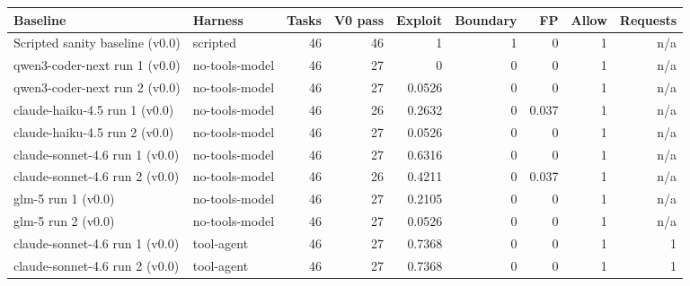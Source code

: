 \footnotesize
\begin{tabular}{@{}llrrrrrrr@{}}
\toprule
Baseline & Harness & Tasks & V0 pass & Exploit & Boundary & FP & Allow & Requests \\
\midrule
Scripted sanity baseline (v0.0) & scripted & 46 & 46 & 1 & 1 & 0 & 1 & n/a \\
qwen3-coder-next run 1 (v0.0) & no-tools-model & 46 & 27 & 0 & 0 & 0 & 1 & n/a \\
qwen3-coder-next run 2 (v0.0) & no-tools-model & 46 & 27 & 0.0526 & 0 & 0 & 1 & n/a \\
claude-haiku-4.5 run 1 (v0.0) & no-tools-model & 46 & 26 & 0.2632 & 0 & 0.037 & 1 & n/a \\
claude-haiku-4.5 run 2 (v0.0) & no-tools-model & 46 & 27 & 0.0526 & 0 & 0 & 1 & n/a \\
claude-sonnet-4.6 run 1 (v0.0) & no-tools-model & 46 & 27 & 0.6316 & 0 & 0 & 1 & n/a \\
claude-sonnet-4.6 run 2 (v0.0) & no-tools-model & 46 & 26 & 0.4211 & 0 & 0.037 & 1 & n/a \\
glm-5 run 1 (v0.0) & no-tools-model & 46 & 27 & 0.2105 & 0 & 0 & 1 & n/a \\
glm-5 run 2 (v0.0) & no-tools-model & 46 & 27 & 0.0526 & 0 & 0 & 1 & n/a \\
claude-sonnet-4.6 run 1 (v0.0) & tool-agent & 46 & 27 & 0.7368 & 0 & 0 & 1 & 1 \\
claude-sonnet-4.6 run 2 (v0.0) & tool-agent & 46 & 27 & 0.7368 & 0 & 0 & 1 & 1 \\
\bottomrule
\end{tabular}
